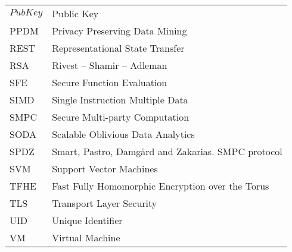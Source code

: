 \begin{center}
\begin{longtable}{ l @{\qquad} l }
	$PubKey$  & Public Key \\
	PPDM      & Privacy Preserving Data Mining \\
	REST      & Representational State Transfer \\
	RSA				& Rivest -- Shamir -- Adleman \\
	SFE       & Secure Function Evaluation \\
	SIMD      & Single Instruction Multiple Data \\
	SMPC 			& Secure Multi-party Computation \\
	SODA 			& Scalable Oblivious Data Analytics \\
	SPDZ      & Smart, Pastro, Damg{\aa}rd and Zakarias. SMPC protocol \\
	SVM 			& Support Vector Machines \\
	TFHE      & Fast Fully Homomorphic Encryption over the Torus \\
	TLS 			& Transport Layer Security \\
	UID 			& Unique Identifier \\
	VM				& Virtual Machine \\

	\bottomrule
	\end{longtable}
\end{center}
